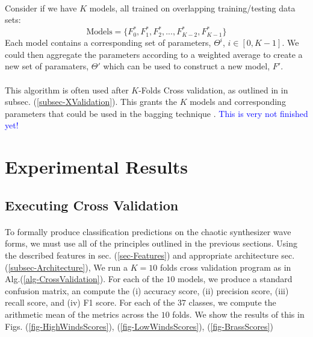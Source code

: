 \documentclass[12pt,letterpaper]{article}
\begin{document}
\paragraph*{}Consider if we have $K$ models, all trained on overlapping training/testing data sets:
\begin{equation}
\text{Models} = \Big\{ F^*_{0} , F^*_{1} , F^*_{2} , ... , F^*_{K-2} , F^*_{K-1} \Big\}
\end{equation}
Each model contains a corresponding set of parameters, $\Theta^{i}$, $i \in [0,K-1]$.
We could then aggregate the parameters according to a weighted average to create a new set of paramaters, $\Theta '$ which can be used to construct a new model, $F'$.

\paragraph*{}This algorithm is often used after $K$-Folds Cross validation, as outlined in in subsec. (\ref{subsec-XValidation}). This grants the $K$ models and corresponding parameters that could be used in the bagging technique \cite{James}. \textcolor{blue}{This is very not finished yet!}


\newpage
\section{Experimental Results}
\label{sec-Results}

\subsection{Executing Cross Validation}

\paragraph*{}To formally produce classification predictions on the chaotic synthesizer wave forms, we must use all of the principles outlined in the previous sections. Using the described features in sec. (\ref{sec-Features}) and appropriate architecture sec. (\ref{subsec-Architecture}), We run a $K=10$ folds cross validation program as in Alg.(\ref{alg-CrossValidation}). For each of the $10$ models, we produce a standard confusion matrix, an compute the (i) accuracy score, (ii) precision score, (iii) recall score, and (iv) F1 score. For each of the $37$ classes, we compute the arithmetic mean of the metrics across the $10$ folds. We show the results of this in Figs. (\ref{fig-HighWindsScores}), (\ref{fig-LowWindsScores}), (\ref{fig-BrassScores})
\end{document}
